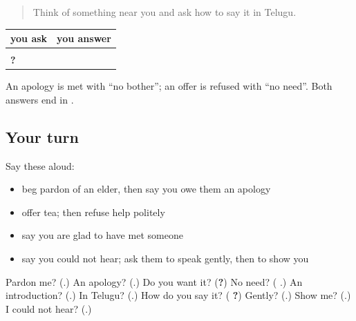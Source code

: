 \label{lesson:TE-R95-second-pass-asking}



\begin{quote}
Think of something near you and ask how to say it in Telugu.
\end{quote}

\begin{grammarlens}[title={Grammar Lens: two kinds of polite}]
\noindent
\begin{tabularx}{\linewidth}{@{}>{\raggedright\arraybackslash}X>{\raggedright\arraybackslash}X@{}}
\toprule
\textbf{you ask} & \textbf{you answer} \\
\midrule
\textbf{\te{మన్నించండి}} & \textbf{\te{పరవాలేదు}} \\
\textbf{\te{టీ} \te{కావాలా}?} & \textbf{\te{అవసరం} \te{లేదు}} \\
\bottomrule
\end{tabularx}

An apology is met with \textquotedblleft{}no bother\textquotedblright{}; an offer is refused with \textquotedblleft{}no need\textquotedblright{}. Both answers end in \textbf{}.
\end{grammarlens}

\subsection*{Your turn}
Say these aloud:

\begin{itemize}
\raggedright
  \item beg pardon of an elder, then say you owe them an apology
  \item offer tea; then refuse help politely
  \item say you are glad to have met someone
  \item say you could not hear; ask them to speak gently, then to show you
\end{itemize}

\begin{tcolorbox}[breakable,colback=teal!4,colframe=teal!35!black,title={Before you move on}]
Pardon me? (\textbf{}.) An apology? (\textbf{}.) Do you want it? (\textbf{?}) No need? (\textbf{ }.) An introduction? (\textbf{}.) In Telugu? (\textbf{}.) How do you say it? (\textbf{ ?}) Gently? (\textbf{}.) Show me? (\textbf{}.) I could not hear? (\textbf{}.)
\end{tcolorbox}
